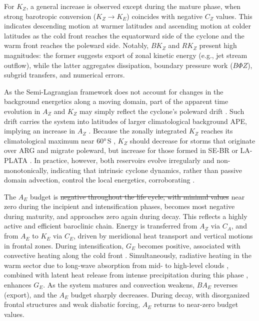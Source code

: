 \documentclass[pdflatex,sn-chicago]{sn-jnl}%
\makeatletter
\theoremstyle{plain}
\theoremstyle{definition}
\theoremstyle{remark}
\theoremstyle{definition}
\providecommand{\DIFaddtex}[1]{{\protect\color{blue}#1}} %
\providecommand{\DIFdeltex}[1]{{\protect\color{red}\sout{#1}}} %
\providecommand{\DIFaddbegin}{} %
\providecommand{\DIFaddend}{} %
\providecommand{\DIFdelbegin}{} %
\providecommand{\DIFdelend}{} %
\providecommand{\DIFadd}[1]{\texorpdfstring{\DIFaddtex{#1}}{#1}} %
\providecommand{\DIFdel}[1]{\texorpdfstring{\DIFdeltex{#1}}{}} %
\let\sout@orig\sout %
\renewcommand{\sout}[1]{\ifmmode\text{\sout@orig{\ensuremath{#1}}}\else\sout@orig{#1}\fi} %
\makeatother
\begin{document}
For $K_Z$, a general increase is observed except during the mature phase, when strong barotropic conversion ($K_Z \rightarrow K_E$) coincides with negative $C_Z$ values. This indicates descending motion at warmer latitudes and ascending motion at colder latitudes as the cold front reaches the equatorward side of the cyclone and the warm front reaches the poleward side. Notably, $BK_Z$ and $RK_Z$ present high magnitudes: the former suggests export of zonal kinetic energy (e.g., jet stream outflow), while the latter aggregates dissipation, boundary pressure work ($B\Phi Z$), subgrid transfers, and numerical errors. 

As the Semi-Lagrangian framework does not account for changes in the background energetics along a moving domain, part of the apparent time evolution in \(A_Z\) and \(K_Z\) may simply reflect the cyclone’s poleward drift \citep{couto2024new}. Such drift carries the system into latitudes of larger climatological background APE, implying an increase in \(A_Z\) \citep{novak2018local, liu2024systematic}. Because the zonally integrated \(K_Z\) reaches its climatological maximum near 60°\,S \citep{novak2018local, liu2024systematic}, \(K_Z\) should decrease for storms that originate over ARG and migrate poleward, but increase for those formed in SE-BR or LA-PLATA . In practice, however, both reservoirs evolve irregularly and non-monotonically, indicating that intrinsic cyclone dynamics, rather than passive domain advection, control the local energetics, corroborating \citet{federer2025synoptic}.

The $A_E$ budget is \DIFdelbegin \DIFdel{negative throughout the life cycle, with minimal values }\DIFdelend \DIFaddbegin \DIFadd{near zero }\DIFaddend during the incipient and intensification phases\DIFaddbegin \DIFadd{, becomes most negative during maturity, and approaches zero again during decay}\DIFaddend . This reflects a highly active and efficient baroclinic chain. Energy is transferred from $A_Z$ via $C_A$, and from $A_E$ to $K_E$ via $C_E$, driven by meridional heat transport and vertical motions in frontal zones. During intensification, $G_E$ becomes positive, associated with convective heating along the cold front \citep[e.g.,][]{govekar2011three}. Simultaneously, radiative heating in the warm sector due to long-wave absorption from mid- to high-level clouds \citep{lau1997comparing,keshtgar2023cloud}, combined with latent heat release from intense precipitation during this phase \citep{mcerlich2023assessment}, enhances $G_E$. As the system matures and convection weakens, $BA_E$ reverses (export), and the $A_E$ budget sharply decreases. During decay, with disorganized frontal structures and weak diabatic forcing, $A_E$ returns to near-zero budget values.
\end{document}
